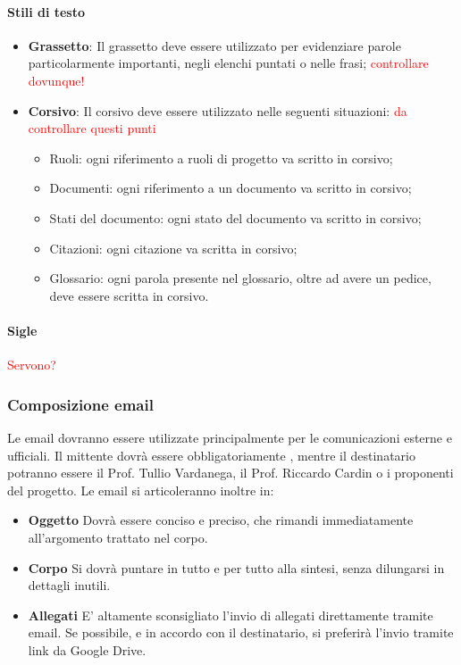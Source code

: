 \paragraph{Stili di testo}
\begin{itemize}
	\item \textbf{Grassetto}: Il grassetto deve essere utilizzato per evidenziare parole
	particolarmente importanti, negli elenchi puntati o nelle frasi; \textcolor{red}{controllare dovunque!}
	\item \textbf{Corsivo}: Il corsivo deve essere utilizzato nelle seguenti
	situazioni: \textcolor{red}{da controllare questi punti}
	\begin{itemize}
		\item Ruoli: ogni riferimento a ruoli di progetto va scritto in corsivo;
		\item Documenti: ogni riferimento a un documento va scritto in corsivo;
		\item Stati del documento: ogni stato del documento va scritto in corsivo;
		\item Citazioni: ogni citazione va scritta in corsivo;
		\item Glossario: ogni parola presente nel glossario, oltre ad avere un pedice, deve
		essere scritta in corsivo.
	\end{itemize}
\end{itemize}
\paragraph{Sigle}
\textcolor{red}{Servono?}
\subsubsection{Composizione email}
Le email dovranno essere utilizzate principalmente per le comunicazioni esterne e ufficiali. Il mittente dovrà essere obbligatoriamente \emph{\Indirizzo}, mentre il destinatario potranno essere il Prof. Tullio Vardanega, il Prof. Riccardo Cardin o i proponenti del progetto. Le email si articoleranno inoltre in:
\begin{itemize}
	\item \textbf{Oggetto}
	Dovrà essere conciso e preciso, che rimandi immediatamente all'argomento trattato nel corpo.
	\item \textbf{Corpo}
	Si dovrà puntare in tutto e per tutto alla sintesi, senza dilungarsi in dettagli inutili.
	\item \textbf{Allegati}
	E' altamente sconsigliato l'invio di allegati direttamente tramite email. Se possibile, e in accordo con il destinatario, si preferirà l'invio tramite link da Google Drive.
\end{itemize} 
